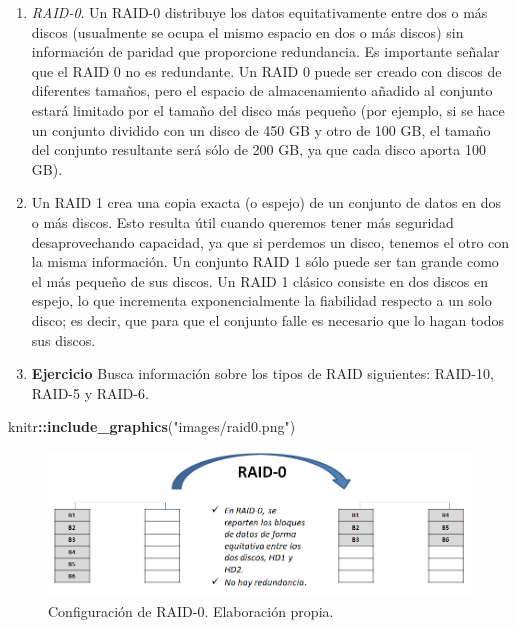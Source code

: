 \documentclass[
]{book}
\newenvironment{Shaded}{\begin{snugshade}}{\end{snugshade}}
\newcommand{\KeywordTok}[1]{\textcolor[rgb]{0.13,0.29,0.53}{\textbf{#1}}}
\newcommand{\NormalTok}[1]{#1}
\newcommand{\OperatorTok}[1]{\textcolor[rgb]{0.81,0.36,0.00}{\textbf{#1}}}
\newcommand{\StringTok}[1]{\textcolor[rgb]{0.31,0.60,0.02}{#1}}
\providecommand{\tightlist}{%
  \setlength{\itemsep}{0pt}\setlength{\parskip}{0pt}}
\begin{document}
\begin{enumerate}
  \begin{enumerate}
  \def\labelenumii{\alph{enumii}.}
  \tightlist
  \item
    \emph{RAID-0}. Un RAID-0 distribuye los datos equitativamente entre dos o más discos (usualmente se ocupa el mismo espacio en dos o más discos) sin información de paridad que proporcione redundancia. Es importante señalar que el RAID 0 no es redundante. Un RAID 0 puede ser creado con discos de diferentes tamaños, pero el espacio de almacenamiento añadido al conjunto estará limitado por el tamaño del disco más pequeño (por ejemplo, si se hace un conjunto dividido con un disco de 450 GB y otro de 100 GB, el tamaño del conjunto resultante será sólo de 200 GB, ya que cada disco aporta 100 GB).
  \item
    Un RAID 1 crea una copia exacta (o espejo) de un conjunto de datos en dos o más discos. Esto resulta útil cuando queremos tener más seguridad desaprovechando capacidad, ya que si perdemos un disco, tenemos el otro con la misma información. Un conjunto RAID 1 sólo puede ser tan grande como el más pequeño de sus discos. Un RAID 1 clásico consiste en dos discos en espejo, lo que incrementa exponencialmente la fiabilidad respecto a un solo disco; es decir, que para que el conjunto falle es necesario que lo hagan todos sus discos.
  \item
    \textbf{Ejercicio} Busca información sobre los tipos de RAID siguientes: RAID-10, RAID-5 y RAID-6.
  \end{enumerate}
\end{enumerate}

\begin{Shaded}
\begin{Highlighting}[]
\NormalTok{knitr}\OperatorTok{::}\KeywordTok{include_graphics}\NormalTok{(}\StringTok{"images/raid0.png"}\NormalTok{)}
\end{Highlighting}
\end{Shaded}

\begin{figure}

{\centering \includegraphics[width=0.9\linewidth]{images/raid0} 

}

\caption{Configuración de RAID-0. Elaboración propia.}\label{fig:rmarkdown}
\end{figure}
\end{document}
